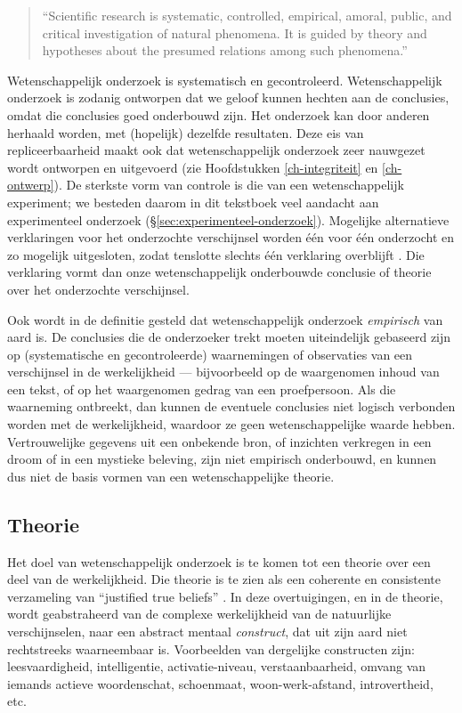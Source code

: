 \documentclass[
]{book}
\begin{document}
\begin{quote}
``Scientific
research is systematic, controlled, empirical, amoral, public, and
critical investigation of natural phenomena. It is guided by theory and hypotheses about the presumed relations among such phenomena.''
\end{quote}

Wetenschappelijk onderzoek is systematisch en gecontroleerd.
Wetenschappelijk onderzoek is zodanig ontworpen dat we geloof kunnen
hechten aan de conclusies, omdat die conclusies goed onderbouwd zijn.
Het onderzoek kan door anderen herhaald worden, met (hopelijk) dezelfde
resultaten. Deze eis van repliceerbaarheid maakt ook dat
wetenschappelijk onderzoek zeer nauwgezet wordt ontworpen en uitgevoerd
(zie Hoofdstukken \ref{ch-integriteit} en \ref{ch-ontwerp}). De sterkste vorm van controle is die van een
wetenschappelijk experiment; we besteden daarom in dit tekstboek veel
aandacht aan experimenteel onderzoek (§\ref{sec:experimenteel-onderzoek}). Mogelijke alternatieve
verklaringen voor het onderzochte verschijnsel worden één voor één
onderzocht en zo mogelijk uitgesloten, zodat tenslotte slechts één
verklaring overblijft \citep{KL00}. Die verklaring vormt dan onze
wetenschappelijk onderbouwde conclusie of theorie over het onderzochte
verschijnsel.

Ook wordt in de definitie gesteld dat wetenschappelijk onderzoek
\emph{empirisch} van aard is. De conclusies die de onderzoeker trekt moeten
uiteindelijk gebaseerd zijn op (systematische en gecontroleerde)
waarnemingen of observaties van een verschijnsel in de werkelijkheid --- bijvoorbeeld op de waargenomen inhoud van een tekst, of op het
waargenomen gedrag van een proefpersoon. Als die waarneming ontbreekt,
dan kunnen de eventuele conclusies niet logisch verbonden worden met de werkelijkheid, waardoor ze geen wetenschappelijke waarde hebben.
Vertrouwelijke gegevens uit een onbekende bron, of inzichten verkregen
in een droom of in een mystieke beleving, zijn niet empirisch
onderbouwd, en kunnen dus niet de basis vormen van een wetenschappelijke theorie.

\subsection{Theorie}\label{sec:theorie}

Het doel van wetenschappelijk
onderzoek is te komen tot een theorie over een deel van de
werkelijkheid. Die theorie is te zien als een coherente en consistente
verzameling van ``justified true beliefs'' \citep{Mort03}. In deze
overtuigingen, en in de theorie, wordt geabstraheerd van de complexe
werkelijkheid van de natuurlijke verschijnselen, naar een abstract
mentaal \emph{construct}, dat uit zijn aard niet rechtstreeks waarneembaar
is. Voorbeelden van dergelijke constructen zijn: leesvaardigheid,
intelligentie, activatie-niveau, verstaanbaarheid, omvang van iemands
actieve woordenschat, schoenmaat, woon-werk-afstand, introvertheid, etc.
\end{document}
